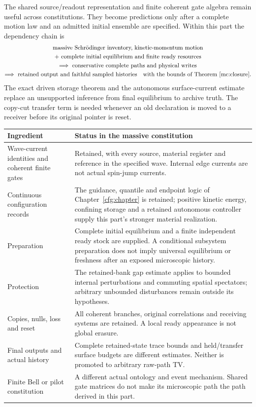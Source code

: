 \documentclass[11pt,oneside,openany]{book}
\theoremstyle{definition}
\theoremstyle{remark}\newtheorem{remark}[theorem]{Remark}
\begin{document}
The shared source/readout representation and finite coherent gate algebra
remain useful across constitutions. They become predictions only after a
complete motion law and an admitted initial ensemble are specified.
Within this part the dependency chain is
\[
\begin{gathered}
 \text{massive Schr\"odinger inventory, kinetic-momentum motion}\\
 +\ \text{complete initial equilibrium and finite ready resources}\\
 \Longrightarrow\ \text{conservative complete paths and physical writes}\\
 \Longrightarrow\ \text{retained output and faithful sampled histories}
 \quad\text{with the bounds of Theorem~\ref{mc:closure}.}
\end{gathered}
\]
The exact driven storage theorem and the autonomous surface-current
estimate replace an unsupported inference from final equilibrium to
archive truth. The copy-cut transfer term is needed whenever an old
declaration is moved to a receiver before its original pointer is reset.

\begin{center}
\begin{tabularx}{\textwidth}{@{}>{\raggedright\arraybackslash}p{}X@{}}
\toprule
Ingredient & Status in the massive constitution\\
\midrule
Wave-current identities and coherent finite gates &
Retained, with every source, material register and reference in the
specified wave. Internal edge currents are not actual spin-jump currents.\\
Continuous configuration records &
The guidance, quantile and endpoint logic of Chapter~\ref{cfg:chapter}
is retained; positive kinetic energy, confining storage and a retained
autonomous controller supply this part's stronger material realization.\\
Preparation &
Complete initial equilibrium and a finite independent ready stock are
supplied. A conditional subsystem preparation does not imply universal
equilibrium or freshness after an exposed microscopic history.\\
Protection &
The retained-bank gap estimate applies to bounded internal perturbations
and commuting spatial spectators; arbitrary unbounded disturbances remain
outside its hypotheses.\\
Copies, nulls, loss and reset &
All coherent branches, original correlations and receiving systems are
retained. A local ready appearance is not global erasure.\\
Final outputs and actual history &
Complete retained-state trace bounds and held/transfer surface budgets
are different estimates. Neither is promoted to arbitrary raw-path TV.\\
Finite Bell or pilot constitution &
A different actual ontology and event mechanism. Shared gate matrices
do not make its microscopic path the path derived in this part.\\
\bottomrule
\end{tabularx}
\end{center}
\end{document}
